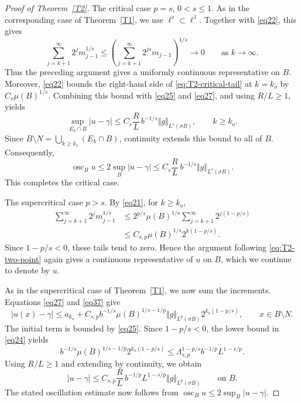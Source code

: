 \documentclass[12pt,leqno]{amsart}
\theoremstyle{definition}
\numberwithin{theorem}{section} \numberwithin{equation}{section}
\begin{document}
\begin{proof}[Proof of Theorem~\ref{T2}]
\medskip
\noindent
{\sc The critical case $p=s$, $0<s\leq1$.}
As in the corresponding case of Theorem~\ref{T1}, we use
$\ell^s\subset\ell^1$. Together with \eqref{eq22}, this gives
\begin{equation}
\label{eq:T2-critical-tail}
 \sum_{j=k+1}^{\infty}2^jm_{j-1}^{1/s}
 \leq
 \left(\sum_{j=k+1}^{\infty}2^{js}m_{j-1}\right)^{1/s}
 \longrightarrow0
 \qquad\text{as }k\to\infty.
\end{equation}
Thus the preceding argument gives a uniformly continuous
representative on $B$.
Moreover, \eqref{eq22} bounds the right-hand side of
\eqref{eq:T2-critical-tail} at $k=k_o$ by $C_s\mu(B)^{1/s}$.
Combining this bound with \eqref{eq25} and \eqref{eq27}, and using
$R/L\geq1$, yields
\begin{equation}
\label{eq34}
 \sup_{E_k\cap B}|u-\gamma|
 \leq C_s\frac RL\,b^{-1/s}\Vert g\Vert_{L^s(\sigma B)},
 \qquad k\geq k_o.
\end{equation}
Since $B\setminus N=\bigcup_{k\geq k_o}(E_k\cap B)$,
continuity extends this bound to all of $B$. Consequently,
\[
 \operatorname{osc}_B u
 \leq 2\sup_B|u-\gamma|
 \leq C_s\frac RL\,b^{-1/s}\Vert g\Vert_{L^s(\sigma B)}.
\]
This completes the critical case.


\medskip
\noindent
{\sc The supercritical case $p>s$.}
By \eqref{eq21}, for $k\geq k_o$,
\begin{equation}
\label{eq37}
\begin{split}
 \sum_{j=k+1}^{\infty}2^jm_{j-1}^{1/s}
 &\leq 2^{p/s}\mu(B)^{1/s}
        \sum_{j=k+1}^{\infty}2^{j(1-p/s)}\\
 &\leq C_{s,p}\mu(B)^{1/s}2^{k(1-p/s)}.
\end{split}
\end{equation}
Since $1-p/s<0$, these tails tend to zero. Hence the argument
following \eqref{eq:T2-two-point} again gives a continuous
representative of $u$ on $B$, which we continue to denote by $u$.


As in the supercritical case of Theorem~\ref{T1}, we now sum the
increments. Equations \eqref{eq27} and \eqref{eq37} give
\[
 |u(x)-\gamma|\leq a_{k_o}
 +C_{s,p}b^{-1/s}\mu(B)^{1/s-1/p}
 \Vert g\Vert_{L^p(\sigma B)}2^{k_o(1-p/s)},
 \qquad x\in B\setminus N.
\]
The initial term is bounded by \eqref{eq25}. Since $1-p/s<0$,
the lower bound in \eqref{eq24} yields
\[
 b^{-1/s}\mu(B)^{1/s-1/p}2^{k_o(1-p/s)}
 \leq \Lambda_{s,p}^{1-p/s}b^{-1/p}L^{1-s/p}.
\]
Using $R/L\geq1$ and extending by continuity, we obtain
\begin{equation}
\label{eq38}
 |u-\gamma|
 \leq C_{s,p}\frac RL\,b^{-1/p}L^{1-s/p}
 \Vert g\Vert_{L^p(\sigma B)}
 \qquad\text{on }B.
\end{equation}
The stated oscillation estimate now follows from
$\operatorname{osc}_B u\leq2\sup_B|u-\gamma|$.


\end{proof}
\end{document}
